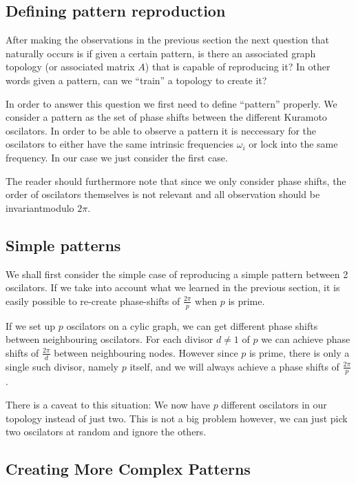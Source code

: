 \label{sec:patterns}

\subsection{Defining pattern reproduction}

After making the observations in the previous section the next question that naturally occurs is if given a certain pattern, is there an associated graph topology (or associated matrix $A$) that is capable of reproducing it? In other words given a pattern, can we ``train'' a topology to create it?

In order to answer this question we first need to define ``pattern'' properly. We consider a pattern as the set of phase shifts between the different Kuramoto oscilators. In order to be able to observe a pattern it is neccessary for the oscilators to either have the same intrinsic frequencies $\omega_i$ or lock into the same frequency. In our case we just consider the first case. 

The reader should furthermore note that since we only consider phase shifts, the order of oscilators themselves is not relevant and all observation should be invariantmodulo $2\pi$. 

\subsection{Simple patterns}

We shall first consider the simple case of reproducing a simple pattern between 2 oscilators. If we take into account what we learned in the previous section, it is easily possible to re-create phase-shifts of $\frac{2\pi}{p}$ when $p$ is prime. 

If we set up $p$ oscilators on a cylic graph, we can get different phase shifts between neighbouring oscilators. For each divisor $d \neq 1$ of $p$ we can achieve phase shifts of $\frac{2\pi}{d}$ between neighbouring nodes. However since $p$ is prime, there is only a single such divisor, namely $p$ itself, and we will always achieve a phase shifts of $\frac{2\pi}{p}$. 

There is a caveat to this situation: We now have $p$ different oscilators in our topology instead of just two. This is not a big problem however, we can just pick two oscilators at random and ignore the others. 

\subsection{Creating More Complex Patterns}

